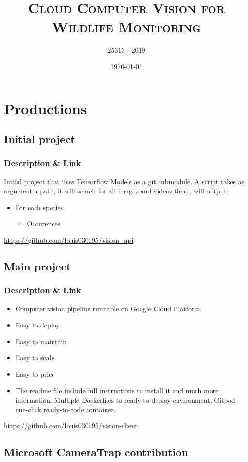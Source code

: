 \documentclass[a4paper,11pt]{report}
\title{\textsc{Cloud Computer Vision for Wildlife Monitoring}} %
\author{\textsc{25313} - \textsc{2019}}
\date{\today}
\begin{document}

\tableofcontents

\chapter{Productions}
\section{Initial project}
\subsection{Description \& Link}
Initial project that uses Tensorflow Models as a git submodule. A script takes as argument a path, it will search for all images
and videos there, will output:
\begin{itemize}
    \item For each species
    \begin{itemize}
        \item Occurences
    \end{itemize}
\end{itemize}

\url{https://github.com/louis030195/vision_api}

\pagebreak\section{Main project}
\subsection{Description \& Link}
\begin{itemize}
    \item Computer vision pipeline runnable on Google Cloud Platform.
    \item Easy to deploy
    \item Easy to maintain
    \item Easy to scale
    \item Easy to price
    \item The readme file include full instructions to install it and much more information. Multiple Dockerfiles to ready-to-deploy environment, Gitpod one-click ready-to-code container.
\end{itemize}

\url{https://github.com/louis030195/vision-client}

\pagebreak\section{Microsoft CameraTrap contribution}
\end{document}
